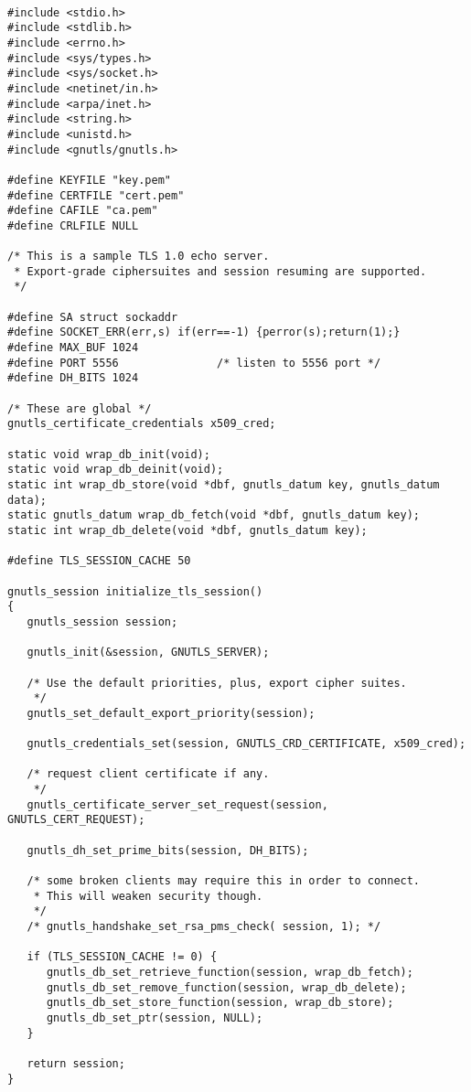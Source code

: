 \begin{verbatim}

#include <stdio.h>
#include <stdlib.h>
#include <errno.h>
#include <sys/types.h>
#include <sys/socket.h>
#include <netinet/in.h>
#include <arpa/inet.h>
#include <string.h>
#include <unistd.h>
#include <gnutls/gnutls.h>

#define KEYFILE "key.pem"
#define CERTFILE "cert.pem"
#define CAFILE "ca.pem"
#define CRLFILE NULL

/* This is a sample TLS 1.0 echo server.
 * Export-grade ciphersuites and session resuming are supported.
 */

#define SA struct sockaddr
#define SOCKET_ERR(err,s) if(err==-1) {perror(s);return(1);}
#define MAX_BUF 1024
#define PORT 5556               /* listen to 5556 port */
#define DH_BITS 1024

/* These are global */
gnutls_certificate_credentials x509_cred;

static void wrap_db_init(void);
static void wrap_db_deinit(void);
static int wrap_db_store(void *dbf, gnutls_datum key, gnutls_datum data);
static gnutls_datum wrap_db_fetch(void *dbf, gnutls_datum key);
static int wrap_db_delete(void *dbf, gnutls_datum key);

#define TLS_SESSION_CACHE 50

gnutls_session initialize_tls_session()
{
   gnutls_session session;

   gnutls_init(&session, GNUTLS_SERVER);

   /* Use the default priorities, plus, export cipher suites.
    */
   gnutls_set_default_export_priority(session);

   gnutls_credentials_set(session, GNUTLS_CRD_CERTIFICATE, x509_cred);

   /* request client certificate if any.
    */
   gnutls_certificate_server_set_request(session, GNUTLS_CERT_REQUEST);

   gnutls_dh_set_prime_bits(session, DH_BITS);

   /* some broken clients may require this in order to connect. 
    * This will weaken security though.
    */
   /* gnutls_handshake_set_rsa_pms_check( session, 1); */

   if (TLS_SESSION_CACHE != 0) {
      gnutls_db_set_retrieve_function(session, wrap_db_fetch);
      gnutls_db_set_remove_function(session, wrap_db_delete);
      gnutls_db_set_store_function(session, wrap_db_store);
      gnutls_db_set_ptr(session, NULL);
   }

   return session;
}


\end{verbatim}
